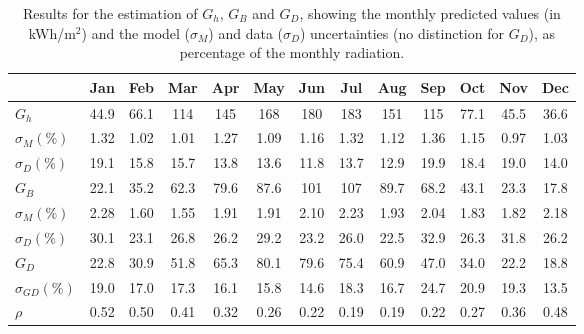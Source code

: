 \begin{table}[b]
\centering
\footnotesize
\caption{Results for the estimation of $G_h$, $G_B$ and $G_D$, showing the monthly predicted values (in kWh/m$^2$) and the model ($\sigma_M$) and data ($\sigma_D$) uncertainties (no distinction for $G_D$), as percentage of the monthly radiation.}
\label{tab:G_results}
\begin{tabular}{lcccccccccccc} %
\hline 
      & \textbf{Jan}  & \textbf{Feb}  & \textbf{Mar}   & \textbf{Apr}   & \textbf{May}   & \textbf{Jun}   & \textbf{Jul}   & \textbf{Aug}   & \textbf{Sep}   & \textbf{Oct}  & \textbf{Nov}  & \textbf{Dec}  \\
\hline 
$G_h$ & 44.9 & 66.1 & 114 & 145 & 168 & 180 & 183 & 151 & 115 & 77.1 & 45.5 & 36.6 \\
$\sigma_{M} (\%)\ $ & 1.32 & 1.02 & 1.01  & 1.27  & 1.09  & 1.16  & 1.32  & 1.12  & 1.36  & 1.15 & 0.97 & 1.03 \\
$\sigma_{D} (\%)\ $  & 19.1 & 15.8 & 15.7  & 13.8  & 13.6  & 11.8  & 13.7  & 12.9  & 19.9  & 18.4 & 19.0 & 14.0 \\
\hline 
$G_B$ & 22.1 & 35.2 & 62.3 & 79.6 & 87.6 & 101 & 107 & 89.7 & 68.2 & 43.1 & 23.3 & 17.8 \\
$\sigma_{M} (\%)\ $ & 2.28 & 1.60 & 1.55 & 1.91 & 1.91 & 2.10  & 2.23  & 1.93 & 2.04 & 1.83 & 1.82 & 2.18 \\
$\sigma_{D} (\%)\ $  & 30.1 & 23.1 & 26.8 & 26.2 & 29.2 & 23.2  & 26.0  & 22.5 & 32.9 & 26.3 & 31.8 & 26.2 \\
\hline 
$G_D$ & 22.8 & 30.9 & 51.8 & 65.3 & 80.1 & 79.6 & 75.4 & 60.9 & 47.0 & 34.0 & 22.2 & 18.8 \\
$\sigma_{GD} (\%)$ & 19.0 & 17.0 & 17.3 & 16.1 & 15.8 & 14.6  & 18.3  & 16.7  & 24.7  & 20.9 & 19.3 & 13.5 \\
\hline
$\rho$ & 0.52 & 0.50 & 0.41 & 0.32 & 0.26 & 0.22 & 0.19 & 0.19 & 0.22 & 0.27 & 0.36 & 0.48 \\
\hline
\end{tabular}
\end{table}

